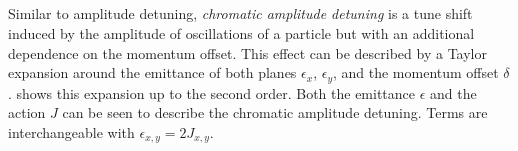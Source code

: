 \subsection{}
\label{subsection:detuning_effects:chromatic_amplitude_detuning}

Similar to amplitude detuning, \textit{chromatic amplitude detuning} is a tune shift induced by the
amplitude of oscillations of a particle but with an additional dependence on the momentum offset.
This effect can be described by a Taylor expansion around the emittance of both planes $\epsilon_x$,
$\epsilon_y$, and the momentum offset $\delta$.
 shows this expansion up to the second order. 
Both the emittance $\epsilon$ and the action $J$ can be seen to describe the chromatic amplitude
detuning. Terms are interchangeable with $\epsilon_{x,y} = 2J_{x,y}$.

